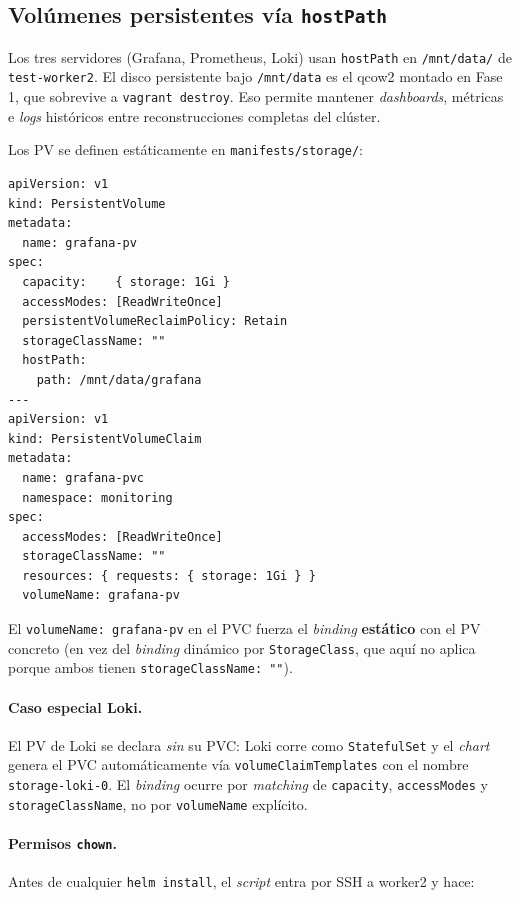 \subsection{Volúmenes persistentes vía \texttt{hostPath}}

Los tres servidores (Grafana, Prometheus, Loki) usan \texttt{hostPath} en \texttt{/mnt/data/} de \texttt{test-worker2}. El disco persistente bajo \texttt{/mnt/data} es el qcow2 montado en Fase 1, que sobrevive a \texttt{vagrant destroy}. Eso permite mantener \emph{dashboards}, métricas e \emph{logs} históricos entre reconstrucciones completas del clúster.

Los PV se definen estáticamente en \texttt{manifests/storage/}:

\begin{lstlisting}[style=yaml]
apiVersion: v1
kind: PersistentVolume
metadata:
  name: grafana-pv
spec:
  capacity:    { storage: 1Gi }
  accessModes: [ReadWriteOnce]
  persistentVolumeReclaimPolicy: Retain
  storageClassName: ""
  hostPath:
    path: /mnt/data/grafana
---
apiVersion: v1
kind: PersistentVolumeClaim
metadata:
  name: grafana-pvc
  namespace: monitoring
spec:
  accessModes: [ReadWriteOnce]
  storageClassName: ""
  resources: { requests: { storage: 1Gi } }
  volumeName: grafana-pv
\end{lstlisting}

El \texttt{volumeName: grafana-pv} en el PVC fuerza el \emph{binding} \textbf{estático} con el PV concreto (en vez del \emph{binding} dinámico por \texttt{StorageClass}, que aquí no aplica porque ambos tienen \texttt{storageClassName: ""}).

\paragraph{Caso especial Loki.} El PV de Loki se declara \emph{sin} su PVC: Loki corre como \texttt{StatefulSet} y el \emph{chart} genera el PVC automáticamente vía \texttt{volumeClaimTemplates} con el nombre \texttt{storage-loki-0}. El \emph{binding} ocurre por \emph{matching} de \texttt{capacity}, \texttt{accessModes} y \texttt{storageClassName}, no por \texttt{volumeName} explícito.

\paragraph{Permisos \texttt{chown}.} Antes de cualquier \texttt{helm install}, el \emph{script} entra por SSH a worker2 y hace:

